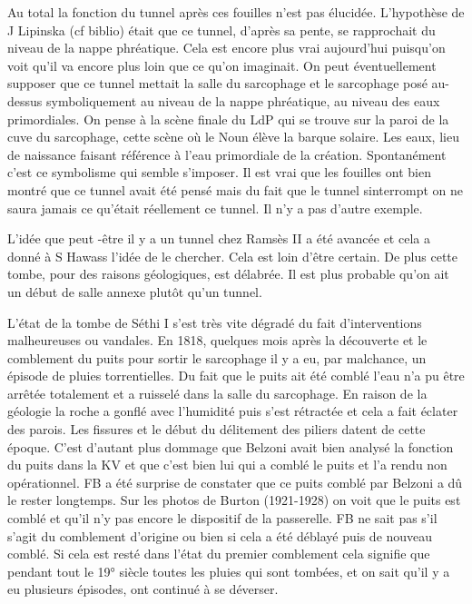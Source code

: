 \documentclass{article}
\begin{document}
Au total la fonction du tunnel après ces fouilles n’est pas élucidée.
L’hypothèse de J Lipinska (cf biblio) était que ce tunnel, d’après sa
pente, se rapprochait du niveau de la nappe phréatique. Cela est encore
plus vrai aujourd’hui puisqu’on voit qu’il va encore plus loin que ce
qu’on imaginait.  On peut éventuellement supposer que ce tunnel mettait
la salle du sarcophage et le sarcophage posé au-dessus symboliquement
au niveau de la nappe phréatique, au niveau des eaux primordiales. On
pense à la scène finale du LdP qui se trouve sur la paroi de la cuve du
sarcophage, cette scène où le Noun élève la barque solaire. Les eaux,
lieu de naissance faisant référence à l’eau primordiale de la création.
Spontanément c’est ce symbolisme qui semble s’imposer. Il est vrai que
les fouilles ont bien montré que ce tunnel avait été pensé mais du fait
que le tunnel s{\textquotesingle}interrompt on ne saura jamais ce
qu’était réellement ce tunnel. Il n’y a pas d’autre exemple. 

L’idée que peut -être il y a un tunnel chez Ramsès II a été avancée et
cela a donné à S Hawass l’idée de le chercher. Cela est loin d’être
certain. De plus cette tombe, pour des raisons géologiques, est
délabrée. Il est plus probable qu’on ait un début de salle annexe
plutôt qu’un tunnel. 

L’état de la tombe de Séthi I s’est très vite dégradé du fait
d’interventions malheureuses ou vandales. En 1818, quelques mois après
la découverte et le comblement du puits pour sortir le sarcophage il y
a eu, par malchance, un épisode de pluies torrentielles. Du fait que le
puits ait été comblé l’eau n’a pu être arrêtée totalement et a ruisselé
dans la salle du sarcophage. En raison de la géologie la roche a gonflé
avec l’humidité puis s’est rétractée et cela a fait éclater des parois.
Les fissures et le début du délitement des piliers datent de cette
époque. C’est d’autant plus dommage que Belzoni avait bien analysé la
fonction du puits dans la KV et que c’est bien lui qui a comblé le
puits et l’a rendu non opérationnel. FB a été surprise de constater que
ce puits comblé par Belzoni a dû le rester longtemps. Sur les photos de
Burton (1921-1928) on voit que le puits est comblé et qu’il n’y pas
encore le dispositif de la passerelle. FB ne sait pas s’il s’agit du
comblement d’origine ou bien si cela a été déblayé puis de nouveau
comblé. Si cela est resté dans l’état du premier comblement cela
signifie que pendant tout le 19° siècle toutes les pluies qui sont
tombées, et on sait qu’il y a eu plusieurs épisodes, ont continué à se
déverser. 
\end{document}
